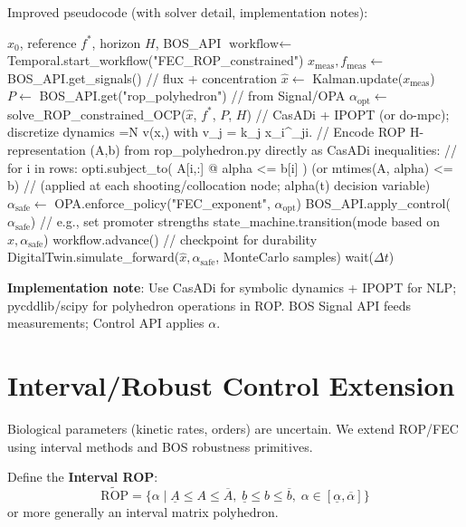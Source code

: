 \documentclass[11pt,a4paper]{article}
\begin{document}
Improved pseudocode (with solver detail, implementation notes):

\begin{algorithmic}[1]
\REQUIRE \(x_0\), reference \(f^*\), horizon \(H\), BOS\_API
\STATE \(\text{workflow} \leftarrow\) Temporal.start\_workflow("FEC\_ROP\_constrained")
    \STATE \(x_{\text{meas}}, f_{\text{meas}} \leftarrow\) BOS\_API.get\_signals()  // flux + concentration
    \STATE \(\hat{x} \leftarrow\) Kalman.update(\(x_{\text{meas}}\))
    \STATE \(P \leftarrow\) BOS\_API.get("rop_polyhedron")  // from Signal/OPA
    \STATE \(\alpha_{\text{opt}} \leftarrow\) solve\_ROP\_constrained\_OCP(\(\hat{x}\), \(f^*\), \(P\), \(H\)) 
           // CasADi + IPOPT (or do-mpc); discretize dynamics =N v(x,\alpha) with v_j = k_j \prod x_i^{\alpha_{ji}}.
           // Encode ROP H-representation (A,b) from rop_polyhedron.py directly as CasADi inequalities:
           //   for i in rows: opti.subject_to( A[i,:] @ alpha <= b[i] )   (or mtimes(A, alpha) <= b)
           //   (applied at each shooting/collocation node; alpha(t) decision variable)
    \STATE \(\alpha_{\text{safe}} \leftarrow\) OPA.enforce\_policy("FEC\_exponent", \(\alpha_{\text{opt}}\))
    \STATE BOS\_API.apply\_control(\(\alpha_{\text{safe}}\))  // e.g., set promoter strengths
    \STATE state\_machine.transition(mode based on \(\hat{x}, \alpha_{\text{safe}}\))
    \STATE workflow.advance()  // checkpoint for durability
    \STATE DigitalTwin.simulate\_forward(\(\hat{x}, \alpha_{\text{safe}}\), MonteCarlo samples)
    \STATE wait(\(\Delta t\))
\ENDWHILE
\end{algorithmic}

\textbf{Implementation note}: Use CasADi for symbolic dynamics + IPOPT for NLP; pycddlib/scipy for polyhedron operations in ROP. BOS Signal API feeds measurements; Control API applies \(\alpha\).

\section{Interval/Robust Control Extension}

Biological parameters (kinetic rates, orders) are uncertain. We extend ROP/FEC using interval methods and BOS robustness primitives.

Define the \textbf{Interval ROP}:
\[
\widetilde{\text{ROP}} = \{ \alpha \mid \underline{A} \leq A \leq \overline{A},\; \underline{b} \leq b \leq \overline{b},\; \alpha \in [ \underline{\alpha}, \overline{\alpha} ] \}
\]
or more generally an interval matrix polyhedron.
\end{document}
